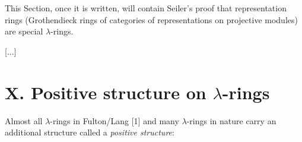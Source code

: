 \documentclass[numbers=enddot,12pt,final,onecolumn,notitlepage]{scrartcl}%
\begin{document}
\begin{center}
\end{center}

This Section, once it is written, will contain Seiler's proof that
representation rings (Grothendieck rings of categories of representations on
projective modules) are special $\lambda$-rings.

[...]

\section*{X. Positive structure on $\lambda$-rings}

Almost all $\lambda$-rings in Fulton/Lang [1] and many $\lambda$-rings in
nature carry an additional structure called a \textit{positive structure}:
\end{document}
